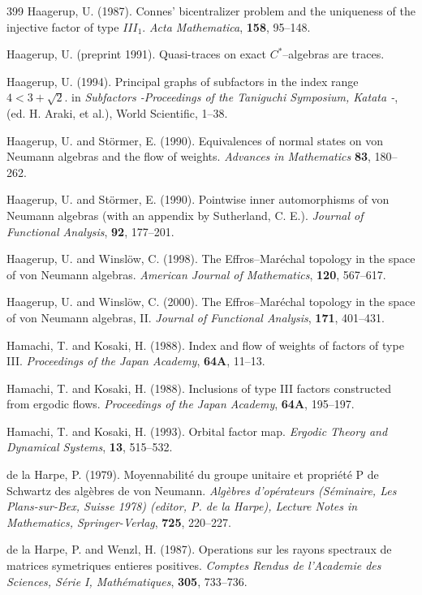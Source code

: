 \documentclass[12pt]{article}
\theoremstyle{plain}
\theoremstyle{definition}
\numberwithin{equation}{section}
\begin{document}
\begin{thebibliography} {399}
Haagerup, U. (1987).
Connes' bicentralizer problem and the uniqueness of 
the injective factor of type $III_1$.
{\em Acta Mathematica}, {\bf 158}, 95--148.

Haagerup, U. (preprint 1991).
Quasi-traces on exact $C^*$--algebras are traces.

Haagerup, U. (1994). Principal graphs of subfactors in the index range 
$4< 3+\sqrt2$. in {\em Subfactors -Proceedings of the Taniguchi Symposium, Katata -},
(ed. H. Araki, et al.), World Scientific, 1--38.

Haagerup, U. and St\"ormer, E. (1990). Equivalences of normal states on von Neumann algebras 
and the flow of weights. {\em Advances in Mathematics} {\bf 83}, 180--262.

Haagerup, U. and St\"ormer, E. (1990).
Pointwise inner automorphisms of von Neumann
algebras (with an appendix by Sutherland, C. E.).
{\em Journal of Functional Analysis}, {\bf 92}, 177--201.

Haagerup, U. and Winsl\"ow, C. (1998).
The Effros--Mar\'echal topology in the space of
von Neumann algebras.
{\em American Journal of Mathematics}, {\bf 120}, 567--617.

Haagerup, U. and Winsl\"ow, C. (2000).
The Effros--Mar\'echal topology in the space of
von Neumann algebras, II.
{\em Journal of Functional Analysis}, {\bf 171}, 401--431.

Hamachi, T. and Kosaki, H. (1988).
Index and flow of weights of factors of type III.
{\em Proceedings of the Japan Academy}, {\bf 64A}, 11--13.

Hamachi, T. and Kosaki, H. (1988).
Inclusions of type III factors constructed from ergodic flows.
{\em Proceedings of the Japan Academy}, {\bf 64A}, 195--197.

Hamachi, T. and Kosaki, H. (1993).
Orbital factor map.
{\em Ergodic Theory and Dynamical Systems}, {\bf 13}, 515--532.

de la Harpe, P. (1979).
Moyennabilit\'e du groupe unitaire et propri\'et\'e
P de Schwartz des alg\`ebres de von Neumann.
{\em Alg\`ebres d'op\'erateurs (S\'eminaire, Les 
Plans-sur-Bex, Suisse 1978) (editor, P. de la
Harpe), Lecture Notes in Mathematics,
Springer-Verlag}, {\bf 725}, 220--227.

de la Harpe, P. and Wenzl, H. (1987).
Operations sur les rayons spectraux de matrices
symetriques entieres  positives.
{\em Comptes Rendus de l'Academie des Sciences, S\'erie I,
Math\'ematiques},
{\bf 305}, 733--736.


\end{thebibliography}
\end{document}
